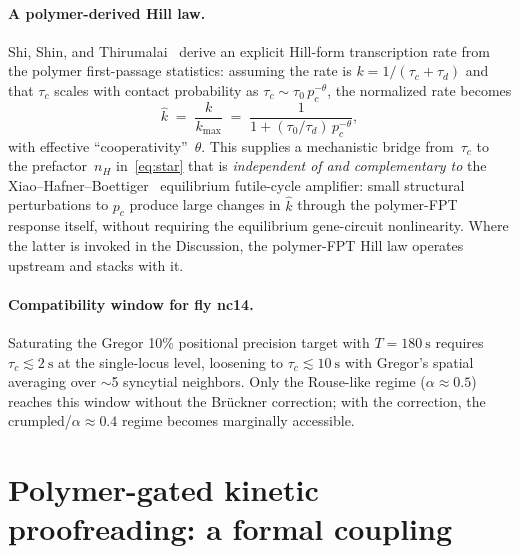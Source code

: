 \documentclass[11pt]{article}
\begin{document}
\paragraph{A polymer-derived Hill law.} Shi, Shin, and
Thirumalai~\cite{Shi2025} derive an explicit Hill-form transcription rate
from the polymer first-passage statistics: assuming the rate is
$k = 1/(\tau_c+\tau_d)$ and that $\tau_c$ scales with contact probability
as $\tau_c\sim\tau_0\,p_c^{-\theta}$, the normalized rate becomes
\begin{equation}
  \hat k \;=\; \frac{k}{k_{\max}}
  \;=\; \frac{1}{1 + (\tau_0/\tau_d)\,p_c^{-\theta}},
  \label{eq:polymer_hill}
\end{equation}
with effective ``cooperativity''~$\theta$. This supplies a mechanistic
bridge from~$\tau_c$ to the prefactor~$n_H$ in~\eqref{eq:star} that is
\emph{independent of and complementary to} the
Xiao--Hafner--Boettiger~\cite{Xiao2021} equilibrium futile-cycle
amplifier: small structural perturbations to $p_c$ produce large changes
in $\hat k$ through the polymer-FPT response itself, without requiring
the equilibrium gene-circuit nonlinearity. Where the latter is invoked in
the Discussion, the polymer-FPT Hill law operates upstream and stacks
with it.

\paragraph{Compatibility window for fly nc14.} Saturating the Gregor 10\%
positional precision target with $T = \SI{180}{\second}$ requires
$\tau_c \lesssim \SI{2}{\second}$ at the single-locus level, loosening to
$\tau_c \lesssim \SI{10}{\second}$ with Gregor's spatial averaging over
$\sim$5 syncytial neighbors. Only the Rouse-like regime
($\alpha\!\approx\!0.5$) reaches this window without the
Br\"uckner correction; with the correction, the
crumpled/$\alpha\!\approx\!0.4$ regime becomes marginally accessible.

\section{Polymer-gated kinetic proofreading: a formal coupling}
\label{sec:gated}
\end{document}
